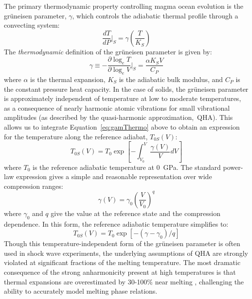 The primary thermodynamic property controlling magma ocean evolution is the gr\"{u}neisen parameter, $\gamma$, which controls the adiabatic thermal profile through a convecting system:
\begin{equation}
\frac{dT}{dP}\bigg|_S = \gamma \left( \frac{T}{K_S} \right)
\label{eq:adiabatprof}
\end{equation}
The {\it thermodynamic} definition of the gr\"{u}neisen parameter is given by:
\begin{equation}
  \gamma \equiv -\frac{\partial \log_e{T}}{\partial \log_e{V}}\bigg|_S =
  \frac{\alpha K_S V}{C_P}
  \label{eq:gamThermo}
\end{equation}
where $\alpha$ is the thermal expansion, $K_S$ is the adiabatic bulk modulus, and $C_P$ is the constant pressure heat capacity.  In the case of solids, the gr\"{u}neisen parameter is approximately independent of temperature at low to moderate temperatures, as a consequence of nearly harmonic atomic vibrations for small vibrational amplitudes (as described by the quasi-harmonic approximation,~QHA).  This allows us to integrate Equation~\ref{eq:gamThermo} above to obtain an expression for the temperature along the reference adiabat, $T_{0S}(V)$:
\begin{equation}
  T_{0S}(V) = T_0 \exp \left[ -\int_{V_0}^{V} \frac{\gamma(V)}{V} dV \right]
  \label{eq:adiabatTempGen}
\end{equation}
where $T_0$ is the reference adiabatic temperature at 0~GPa.
The standard power-law expression gives a simple and reasonable representation over wide compression ranges:
\begin{equation}
  \gamma(V) = \gamma_0 \left(\frac{V}{V_0}\right)^q
  \label{eq:gamPowLaw}
\end{equation}
where $\gamma_0$ and $q$ give the value at the reference state and the compression dependence.
In this form, the reference adiabatic temperature simplifies to:
\begin{equation}
  T_{0S}(V) = T_0 \exp \left[ -(\gamma - \gamma_0)/q \right]
  \label{eq:adiabatTemp}
\end{equation}
Though this temperature-independent form of the gr\"{u}neisen parameter is often used in shock wave experiments, the underlying assumptions of QHA are strongly violated at significant fractions of the melting temperature.
The most dramatic consequence of the strong anharmonicity present at high temperatures is that thermal expansions are overestimated by 30-100\% near melting \cite{WW09}, challenging the ability to accurately model melting phase relations.

